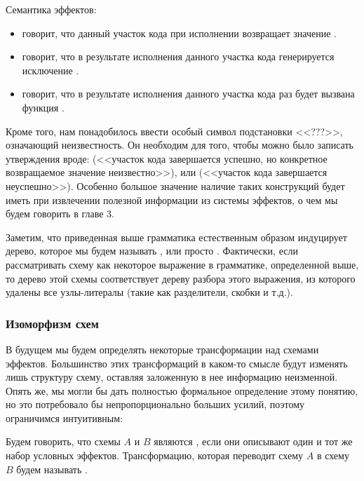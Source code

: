 Семантика эффектов:

\begin{itemize}
    \item {} говорит, что данный участок кода при исполнении возвращает значение .
    
    \item {} говорит, что в результате исполнения данного участка кода генерируется исключение .
    
    \item {} говорит, что в результате исполнения данного участка кода  раз будет вызвана функция .
\end{itemize}

Кроме того, нам понадобилось ввести особый символ подстановки <<???>>, означающий неизвестность. Он необходим для того, чтобы можно было записать утверждения вроде:  (<<участок кода завершается успешно, но конкретное возвращаемое значение неизвестно>>), или  (<<участок кода завершается неуспешно>>). Особенно большое значение наличие таких конструкций будет иметь при извлечении полезной информации из системы эффектов, о чем мы будем говорить в главе 3.

Заметим, что приведенная выше грамматика естественным образом индуцирует дерево, которое мы будем называть , или просто . Фактически, если рассматривать схему как некоторое выражение в грамматике, определенной выше, то дерево этой схемы соответствует дереву разбора этого выражения, из которого удалены все узлы-литералы (такие как разделители, скобки и т.д.). 


\subsubsection{Изоморфизм схем}

В будущем мы будем определять некоторые трансформации над схемами эффектов. Большинство этих трансформаций в каком-то смысле будут изменять лишь структуру схему, оставляя заложенную в нее информацию неизменной. Опять же, мы могли бы дать полностью формальное определение этому понятию, но это потребовало бы непропорционально больших усилий, поэтому ограничимся интуитивным:

\begin{definition}
    Будем говорить, что схемы $A$ и $B$ являются , если они описывают один и тот же набор условных эффектов. Трансформацию, которая переводит схему $A$ в схему $B$ будем называть .
\end{definition}

